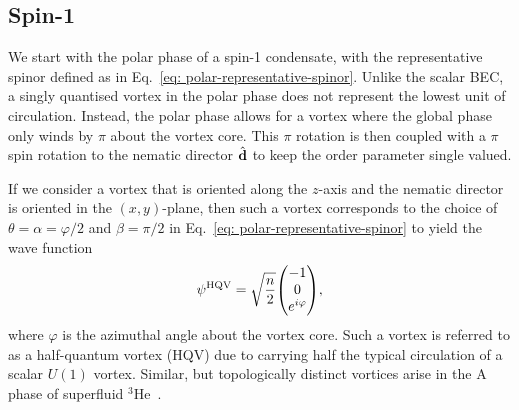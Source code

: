 \subsection{Spin-1}\label{sec: vortices-spin-1}
We start with the polar phase of a spin-1 condensate, with the representative
spinor defined as in Eq.~\eqref{eq: polar-representative-spinor}.
Unlike the scalar BEC, a singly quantised vortex in the polar phase does not
represent the lowest unit of circulation.
Instead, the polar phase allows for a vortex where the global phase only winds
by \(\pi \) about the vortex core.
This \(\pi \) rotation is then coupled with a \(\pi \) spin rotation to the
nematic director \(\hat{\vb{d}}\) to keep the order parameter single valued.

If we consider a vortex that is oriented along the \(z\)-axis and the nematic
director is oriented in the \((x, y)\)-plane, then such a vortex corresponds to
the choice of \(\theta=\alpha=\varphi/2 \) and \(\beta = \pi/2\) in
Eq.~\eqref{eq: polar-representative-spinor} to yield the wave function
\begin{equation}
    \psi^\mathrm{HQV} = \sqrt{\frac{n}{2}} \mqty(
    -1 \\
    0 \\
    e^{i\varphi}
    ),
    \label{eq: polar-HQV}
\end{equation}
where \(\varphi \) is the azimuthal angle about the vortex core.
Such a vortex is referred to as a half-quantum vortex (HQV) due to carrying
half the typical circulation of a scalar \(U(1)\) vortex.
Similar, but topologically distinct vortices arise in the A phase of
superfluid \( ^3\)He~\cite{Salomaa1985, Salomaa1987}.

